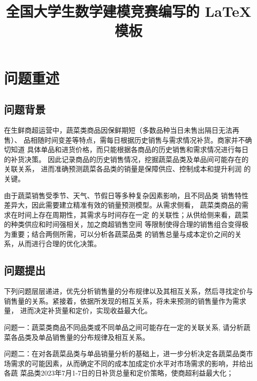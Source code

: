 \documentclass{cumcmthesis}
\title{全国大学生数学建模竞赛编写的 \LaTeX{} 模板}
\begin{document}
 \maketitle
 \begin{abstract}%

\end{abstract}



\section{问题重述}%
\subsection{问题背景}

在生鲜商超运营中，蔬菜类商品因保鲜期短（多数品种当日未售出隔日无法再售）、
品相随时间变差等特点，需每日根据历史销售与需求情况补货。商家并不确切知道
具体单品和进货价格，而只能根据各商品的历史销售和需求情况进行每日的补货决策。
因此记录商品的历史销售情况，挖掘蔬菜品类及单品间可能存在的关联关系，
进而准确预测蔬菜各品类的销量是保障供应、控制成本和提升利润
的关键。

由于蔬菜销售受季节、天气、节假日等多种复杂因素影响，且不同品类
销售特性差异大，因此需要建立精准有效的销量预测模型。从需求侧看，
蔬菜类商品的需求在时间上存在周期性，其需求与时间存在一定
的关联性；从供给侧来看，蔬菜的种类供应和时间强相关，加之商超销售空间
等限制使得合理的销售组合变得极为重要；结合两侧所需，可以分析各蔬菜品类
的销售总量与成本定价之间的关系，从而进行合理的优化决策。


\subsection{问题提出}

下列问题层层递进，优先分析销售量的分布规律以及其相互关系，然后寻找定价与
销售量的关系。紧接着，依据所发现的相互关系，将未来预测的销售量作为需求量，
进而决定补货量和定价，实现收益最大化。

问题一：蔬菜类商品不同品类或不同单品之间可能存在一定的关联关系,
请分析蔬菜各品类及单品销售量的分布规律及相互关系。

问题二：在对各蔬菜品类与单品销量分析的基础上，进一步分析决定各蔬菜品类市
场需求的可能因素，从而确定不同的成本加成定价水平对市场需求的影响，并给出各蔬
菜品类2023年7月1-7日的日补货总量和定价策略，使商超利益最大化； 
\end{document}
